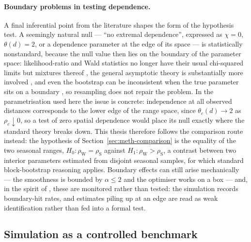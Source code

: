 \paragraph{Boundary problems in testing dependence.}
A final inferential point from the literature shapes the form of the hypothesis test. A seemingly natural null --- ``no extremal dependence'', expressed as \(\chi=0\), \(\theta(d)=2\), or a dependence parameter at the edge of its space --- is statistically nonstandard, because the null value then lies on the boundary of the parameter space: likelihood-ratio and Wald statistics no longer have their usual chi-squared limits but mixtures thereof \citep{chernoff1954,self1987}, the general asymptotic theory is substantially more involved \citep{andrews2001}, and even the bootstrap can be inconsistent when the true parameter sits on a boundary \citep{andrews2000}, so resampling does not repair the problem. In the parametrisation used here the issue is concrete: independence at all observed distances corresponds to the lower edge of the range space, since \(\theta_c(d)\to2\) as \(\rho_c\downarrow0\), so a test of zero spatial dependence would place its null exactly where the standard theory breaks down. This thesis therefore follows the comparison route instead: the hypothesis of Section~\ref{sec:meth-comparison} is the equality of the two seasonal ranges, \(H_0:\rho_{\mathrm W}=\rho_{\mathrm S}\) against \(H_1:\rho_{\mathrm W}>\rho_{\mathrm S}\), a contrast between two interior parameters estimated from disjoint seasonal samples, for which standard block-bootstrap reasoning applies. Boundary effects can still arise mechanically --- the smoothness is bounded by \(\alpha\le2\) and the optimiser works on a box --- and, in the spirit of \citet{andrews2001}, these are monitored rather than tested: the simulation records boundary-hit rates, and estimates piling up at an edge are read as weak identification rather than fed into a formal test.

\subsection{Simulation as a controlled benchmark}\label{sec:lit-simulation}

